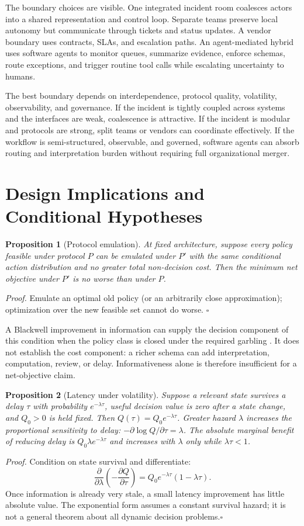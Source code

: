 \documentclass[11pt]{article}
\newtheorem{proposition}{Proposition}
\begin{document}
The boundary choices are visible. One integrated incident room coalesces actors
into a shared representation and control loop. Separate teams preserve local
autonomy but communicate through tickets and status updates. A vendor boundary
uses contracts, SLAs, and escalation paths. An agent-mediated hybrid uses
software agents to monitor queues, summarize evidence, enforce schemas, route
exceptions, and trigger routine tool calls while escalating uncertainty to
humans.

The best boundary depends on interdependence, protocol quality, volatility,
observability, and governance. If the incident is tightly coupled across
systems and the interfaces are weak, coalescence is attractive. If the incident
is modular and protocols are strong, split teams or vendors can coordinate
effectively. If the workflow is semi-structured, observable, and governed,
software agents can absorb routing and interpretation burden without requiring
full organizational merger.

\section{Design Implications and Conditional Hypotheses}


\begin{proposition}[Protocol emulation]
At fixed architecture, suppose every policy feasible under protocol $P$ can
be emulated under $P'$ with the same conditional action distribution and no
greater total non-decision cost. Then the minimum net objective under $P'$
is no worse than under $P$.
\end{proposition}
\noindent\textit{Proof.} Emulate an optimal old policy (or an arbitrarily
close approximation); optimization over the new feasible set cannot do worse.
\hfill$\square$

A Blackwell improvement in information can supply the decision component of
this condition when the policy class is closed under the required garbling
\cite{blackwell1953}. It does not establish the cost component: a richer
schema can add interpretation, computation, review, or delay. Informativeness
alone is therefore insufficient for a net-objective claim.


\begin{proposition}[Latency under volatility]
\label{prop:latency}
Suppose a relevant state survives a delay $\tau$ with probability
$e^{-\lambda\tau}$, useful decision value is zero after a state change, and
$Q_0>0$ is held fixed. Then $Q(\tau)=Q_0e^{-\lambda\tau}$.
Greater hazard $\lambda$ increases the proportional sensitivity to delay:
$-\partial\log Q/\partial\tau=\lambda$. The absolute marginal benefit of
reducing delay is $Q_0\lambda e^{-\lambda\tau}$ and increases with $\lambda$
only while $\lambda\tau<1$.
\end{proposition}
\noindent\textit{Proof.} Condition on state survival and differentiate:
\[
\frac{\partial}{\partial\lambda}
\left(-\frac{\partial Q}{\partial\tau}\right)
=Q_0e^{-\lambda\tau}(1-\lambda\tau).
\]
Once information is already very stale, a small latency improvement has little
absolute value. The exponential form assumes a constant survival hazard; it
is not a general theorem about all dynamic decision problems.\hfill$\square$
\end{document}
